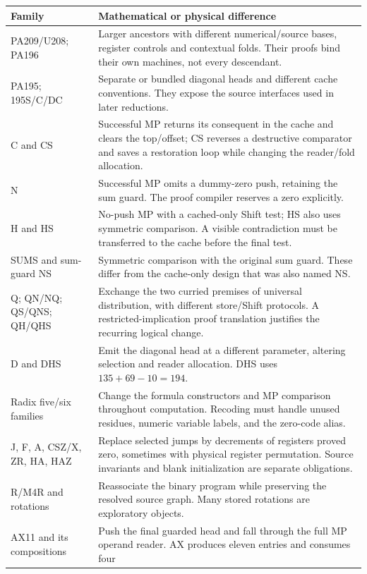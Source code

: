 \documentclass[11pt]{article}
\theoremstyle{definition}\newtheorem{definition}[theorem]{Definition}
\begin{document}
\begin{longtable}{>{\raggedright\arraybackslash}p{.19\linewidth}p{.73\linewidth}}
\toprule Family & Mathematical or physical difference\\\midrule\endhead
PA209/U208; PA196 & Larger ancestors with different numerical/source bases,
register controls and contextual folds. Their proofs bind their own
machines, not every descendant.\\
PA195; 195S/C/DC & Separate or bundled diagonal heads and different cache
conventions. They expose the source interfaces used in later reductions.\\
C and CS & Successful MP returns its consequent in the cache and clears
the top/offset; CS reverses a destructive comparator and saves a restoration
loop while changing the reader/fold allocation.\\
N & Successful MP omits a dummy-zero push, retaining the sum guard. The
proof compiler reserves a zero explicitly.\\
H and HS & No-push MP with a cached-only Shift test; HS also uses symmetric
comparison. A visible contradiction must be transferred to the cache
before the final test.\\
SUMS and sum-guard NS & Symmetric comparison with the original sum guard.
These differ from the cache-only design that was also named NS.\\
Q; QN/NQ; QS/QNS; QH/QHS & Exchange the two curried premises of universal
distribution, with different store/Shift protocols. A restricted-implication
proof translation justifies the recurring logical change.\\
D and DHS & Emit the diagonal head at a different parameter, altering
selection and reader allocation. DHS uses $135+69-10=194$.\\
Radix five/six families & Change the formula constructors and MP comparison
throughout computation. Recoding must handle unused residues, numeric
variable labels, and the zero-code alias.\\
J, F, A, CSZ/X, ZR, HA, HAZ & Replace selected jumps by decrements of registers
proved zero, sometimes with physical register permutation. Source
invariants and blank initialization are separate obligations.\\
R/M4R and rotations & Reassociate the binary program while preserving the
resolved source graph. Many stored rotations are exploratory objects.\\
AX11 and its compositions & Push the final guarded head and fall through
the full MP operand reader. AX produces eleven entries and consumes four

\end{longtable}
\end{document}
